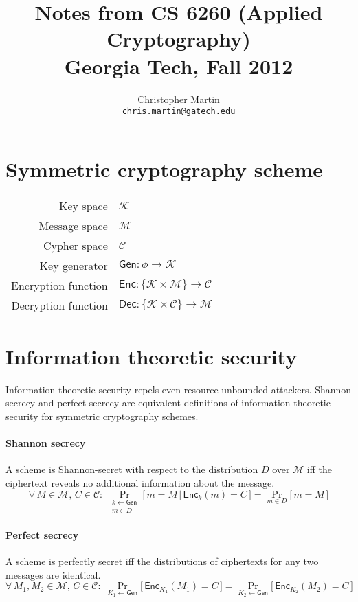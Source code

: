 \documentclass[11pt]{article}
\date{}
\title{Notes from CS 6260 (Applied Cryptography)\\Georgia Tech, Fall 2012}
\author{Christopher Martin\\{\tt chris.martin@gatech.edu}}
\newcommand{\Gen}{\ensuremath{\mathsf{Gen}}}
\newcommand{\Enc}{\ensuremath{\mathsf{Enc}}}
\newcommand{\Dec}{\ensuremath{\mathsf{Dec}}}
\theoremstyle{remark}
\begin{document}
\maketitle

\section{Symmetric cryptography scheme}

\begin{tabular}{r|l}
Key space & $\mathcal{K}$ \\
Message space & $\mathcal{M}$ \\
Cypher space & $\mathcal{C}$ \\
Key generator & $\Gen : \phi \rightarrow \mathcal{K}$ \\
Encryption function &
$\Enc : \{\mathcal{K} \times \mathcal{M}\} \rightarrow \mathcal{C}$ \\
Decryption function &
$\Dec : \{\mathcal{K} \times \mathcal{C}\} \rightarrow \mathcal{M}$
\end{tabular}

\section{Information theoretic security}

Information theoretic security repels even resource-unbounded attackers.
Shannon secrecy and perfect secrecy are equivalent definitions of
information theoretic security for symmetric cryptography schemes.

\paragraph{Shannon secrecy}
A scheme is Shannon-secret with respect to the distribution $D$ over $\mathcal{M}$
iff the ciphertext reveals no additional information about the message.
\[ \forall \, M \in \mathcal{M}, \, C \in \mathcal{C}: \;
  \Pr_{\substack{k \leftarrow \Gen\\m \in D}} \big[\, m = M \,\vert\, \Enc_k(m) = C \,\big]
= \Pr_{m\in D} \big[\, m = M \,\big] \]

\paragraph{Perfect secrecy}
A scheme is perfectly secret iff the distributions of ciphertexts for any
two messages are identical.
\[\forall\, M_1, M_2 \in \mathcal{M},\, C \in \mathcal{C}:\;
  \Pr_{K_1\leftarrow\Gen} \big[\, \Enc_{K_1}(M_1) = C \,\big]
= \Pr_{K_2\leftarrow\Gen} \big[\, \Enc_{K_2}(M_2) = C \,\big] \]
\end{document}
